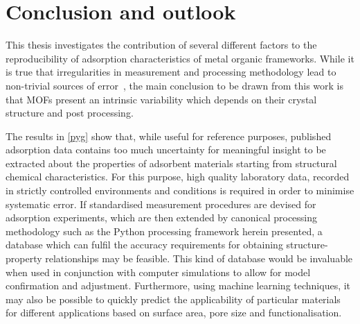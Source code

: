 
\graphicspath{ {\thisch/figures/} }

\chapter*{Conclusion and outlook}\label{conclusion}

This thesis investigates the contribution of several
different factors to the reproducibility of adsorption characteristics
of metal organic frameworks. While it is true that irregularities 
in measurement and processing methodology lead to non-trivial
sources of error~\cite{nguyenReferenceHighpressureCO22018, %
parkHowReproducibleAre2017}, the main conclusion to be drawn 
from this work is that \glspl{MOF}
present an intrinsic variability which depends on their crystal
structure and post processing.

The results in \autoref{pyg} show that, while useful for reference
purposes, published adsorption data contains too much
uncertainty for meaningful insight to be extracted about the properties
of adsorbent materials starting from structural chemical characteristics.
For this purpose, high quality laboratory data, recorded in strictly 
controlled environments and conditions is required in order to 
minimise systematic error. If standardised measurement procedures 
are devised for adsorption experiments, which are then extended 
by canonical processing methodology such as the Python processing 
framework herein presented, a database which can fulfil the accuracy
requirements for obtaining structure-property relationships may be
feasible. This kind of database would be invaluable when used in
conjunction with computer simulations
to allow for model confirmation and adjustment. Furthermore, using machine
learning techniques, it may also be possible to quickly predict the
applicability of particular materials for different applications
based on surface area, pore size and functionalisation.

